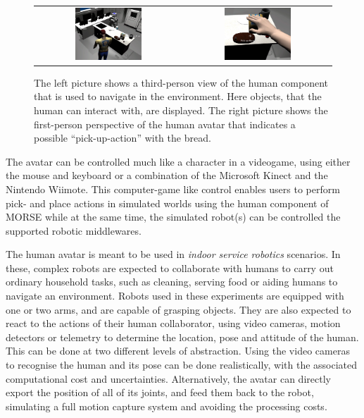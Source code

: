 \documentclass{llncs}
\begin{document}
\begin{figure}[h!]
\centering
\begin{tabular}{cc}
 \includegraphics[width=0.475\textwidth]{pics/human_control_1.png} &
 \includegraphics[width=0.475\textwidth]{pics/human_control_2.png}
\end{tabular}
\caption{The left picture shows a third-person view of the human component that
    is used to navigate in the environment. Here objects, that the human can
    interact with, are displayed. The right picture shows the first-person
    perspective of the human avatar that indicates a possible
    ``pick-up-action'' with the bread.}
\label{fig:human_control}
\end{figure}

The avatar can be controlled much like a character in a videogame, using either
the mouse and keyboard or a combination of the Microsoft Kinect and the
Nintendo Wiimote. This computer-game like control enables users to perform
pick- and place actions in simulated worlds using the human component of MORSE
while at the same time, the simulated robot(s) can be controlled the supported
robotic middlewares.


The human avatar is meant to be used in \emph{indoor service robotics} scenarios.
In these, complex robots are expected to collaborate with humans to carry out
ordinary household tasks, such as cleaning, serving food or aiding humans to
navigate an environment.
Robots used in these experiments are equipped with one or two arms, and are
capable of grasping objects. They are also expected to react to the actions of
their human collaborator, using video cameras, motion detectors or telemetry to
determine the location, pose and attitude of the human.
This can be done at two different levels of
abstraction. Using the video cameras to recognise the human and its pose can be
done realistically, with the associated computational cost and uncertainties.
Alternatively, the avatar can directly export the position of all of its
joints, and feed them back to the robot, simulating a full motion capture
system and avoiding the processing costs.
\end{document}
